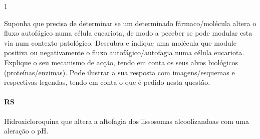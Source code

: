 \documentclass[\mainfilename]{subfiles}
\begin{document}
\begin{questionBox}1{}
    
    Suponha que precisa de determinar se um determinado fármaco/molécula altera o fluxo autofágico numa célula eucariota, de modo a peceber se pode modular esta via num contexto patológico.
    Descubra e indique uma molécula que module positiva ou negativamente o fluxo autofágico/autofagia numa célula eucariota. Explique o seu mecanismo de acção, tendo em conta os seus alvos biológicos (proteínas/enzimas). Pode ilustrar a sua resposta com imagens/esquemas e respectivas legendas, tendo em conta o que é pedido nesta questão.

    \paragraph*{RS}
    Hidroxicloroquina que altera a altofagia dos lissosomas alcoolizandoas com uma aleração o pH.
    
\end{questionBox}
\end{document}
